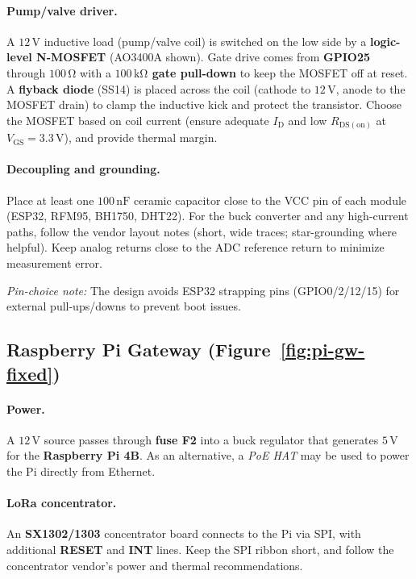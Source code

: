\documentclass[12pt,onecolumn]{IEEEtran} %
\begin{document}
\paragraph{Pump/valve driver.}
A $12\,\mathrm{V}$ inductive load (pump/valve coil) is switched on the low side by a \textbf{logic-level N-MOSFET} (AO3400A shown).  
Gate drive comes from \textbf{GPIO25} through \textbf{$100\,\mathrm{\Omega}$} with a \textbf{$100\,\mathrm{k\Omega}$ gate pull-down}
to keep the MOSFET off at reset.  
A \textbf{flyback diode} (SS14) is placed across the coil (cathode to $12\,\mathrm{V}$, anode to the MOSFET drain) to clamp
the inductive kick and protect the transistor.  
Choose the MOSFET based on coil current (ensure adequate $I_\mathrm{D}$ and low $R_\mathrm{DS(on)}$ at $V_\mathrm{GS}=3.3\,\mathrm{V}$),
and provide thermal margin.

\paragraph{Decoupling and grounding.}
Place at least one \textbf{$100\,\mathrm{nF}$} ceramic capacitor close to the VCC pin of each module (ESP32, RFM95, BH1750, DHT22).
For the buck converter and any high-current paths, follow the vendor layout notes (short, wide traces; star-grounding where helpful).
Keep analog returns close to the ADC reference return to minimize measurement error.

\medskip
\noindent\textit{Pin-choice note:} The design avoids ESP32 strapping pins (GPIO0/2/12/15) for external pull-ups/downs to prevent boot issues.

\subsection*{Raspberry Pi Gateway (Figure~\ref{fig:pi-gw-fixed})}

\paragraph{Power.}
A $12\,\mathrm{V}$ source passes through \textbf{fuse F2} into a buck regulator that generates $5\,\mathrm{V}$ for the
\textbf{Raspberry Pi 4B}.  
As an alternative, a \emph{PoE HAT} may be used to power the Pi directly from Ethernet.

\paragraph{LoRa concentrator.}
An \textbf{SX1302/1303} concentrator board connects to the Pi via SPI, with additional \textbf{RESET} and \textbf{INT} lines.  
Keep the SPI ribbon short, and follow the concentrator vendor’s power and thermal recommendations.
\end{document}
